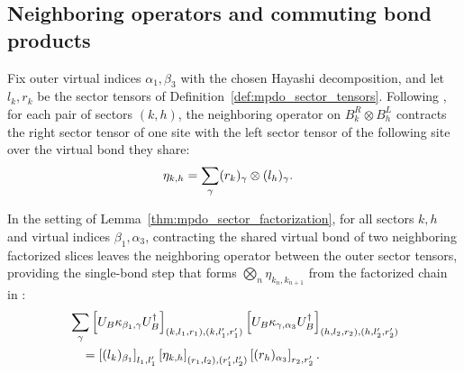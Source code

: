 \subsection{Neighboring operators and commuting bond products}

\begin{definition}%
    \label{def:mpdo_sector_eta}
    \leanok
    Fix outer virtual indices $\alpha_1,\beta_3$ with the chosen Hayashi
    decomposition, and let $l_k,r_k$ be the sector tensors of
    Definition~\ref{def:mpdo_sector_tensors}. Following
    \cite[Appendix~C.2, lines~1441--1445]{Cirac2016MPDO_arXiv}, for each pair
    of sectors $(k,h)$, the neighboring operator on $B_k^{R}\otimes B_h^{L}$
    contracts the right sector tensor of one site with the left sector tensor
    of the following site over the virtual bond they share:
    \begin{align}
        \eta_{k,h}
         & =\sum_{\gamma}(r_k)_{\gamma}\otimes(l_h)_{\gamma}.
        \notag
    \end{align}
\end{definition}

\begin{lemma}
    \label{thm:mpdo_neighboring_bond_contraction}
    \leanok
    In the setting of Lemma~\ref{thm:mpdo_sector_factorization}, for all
    sectors $k,h$ and virtual indices $\beta_1,\alpha_3$, contracting the
    shared virtual bond of two neighboring factorized slices leaves the
    neighboring operator between the outer sector tensors, providing the
    single-bond step that forms $\bigotimes_{n}\eta_{k_n,k_{n+1}}$ from the
    factorized chain in
    \cite[Appendix~C.2, lines~1446--1449]{Cirac2016MPDO_arXiv}:
    \begin{align}
         & \sum_{\gamma}
        \left[U_B\kappa_{\beta_1,\gamma}U_B^\dagger\right]_{(k,l_1,r_1),(k,l_1',r_1')}
        \left[U_B\kappa_{\gamma,\alpha_3}U_B^\dagger\right]_{(h,l_2,r_2),(h,l_2',r_2')}
        \notag           \\
         & \quad =
        \left[(l_k)_{\beta_1}\right]_{l_1,l_1'}
        \left[\eta_{k,h}\right]_{(r_1,l_2),(r_1',l_2')}
        \left[(r_h)_{\alpha_3}\right]_{r_2,r_2'}.
        \notag
    \end{align}
\end{lemma}

